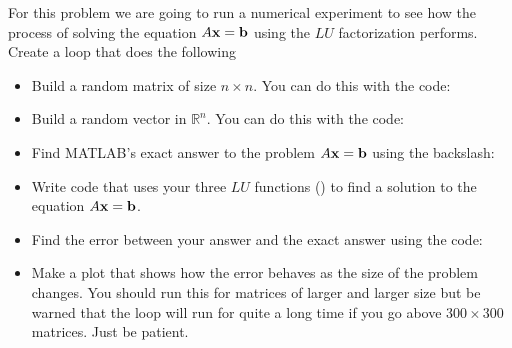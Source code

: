 \begin{problem}
    For this problem we are going to run a numerical experiment to see how the process of
    solving the equation $A {\bf x} = {\bf b}$ using the $LU$ factorization performs.\\ 
    \noindent Create a loop that does the following
    \begin{itemize}
        \item Build a random matrix of size $n \times n$. You can do this with the code:
            \\
        \item Build a random vector in $\mathbb{R}^{n}$. You can do this with the code: \\
        \item Find MATLAB's exact answer to the problem $A{\bf x}={\bf b}$ using the backslash: \\
        \item Write code that uses your three $LU$ functions () to find a solution to the equation $A{\bf x}={\bf b}$.
        \item Find the error between your answer and the exact answer using the code: \\
        \item Make a plot that shows how the error behaves as the size of the problem
            changes. You should run this for matrices of larger and larger size but be
            warned that the loop will run for quite a long time if you go above
            $300×300$ matrices. Just be patient.
    \end{itemize}
\end{problem}

